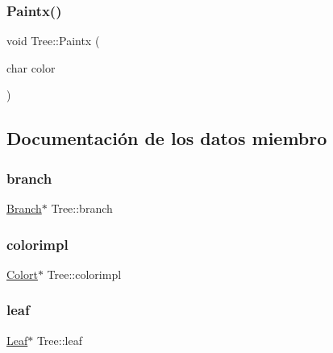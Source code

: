 \subsubsection{\texorpdfstring{Paintx()}{Paintx()}}
{\footnotesize\ttfamily void Tree\+::\+Paintx (\begin{DoxyParamCaption}\item[{char}]{color }\end{DoxyParamCaption})\hspace{0.3cm}{\ttfamily [inline]}}



\subsection{Documentación de los datos miembro}
\mbox{\label{class_tree_a56e2e117486ac449000deab0efac4a1e}} 
\subsubsection{\texorpdfstring{branch}{branch}}
{\footnotesize\ttfamily \mbox{\hyperlink{class_branch}{Branch}}$\ast$ Tree\+::branch}

\mbox{\label{class_tree_a2cd388a817a7325972d81589a6adc62b}} 
\subsubsection{\texorpdfstring{colorimpl}{colorimpl}}
{\footnotesize\ttfamily \mbox{\hyperlink{class_colort}{Colort}}$\ast$ Tree\+::colorimpl\hspace{0.3cm}{\ttfamily [protected]}}

\mbox{\label{class_tree_a4b20e3eadca4c054d79eb7a57579806f}} 
\subsubsection{\texorpdfstring{leaf}{leaf}}
{\footnotesize\ttfamily \mbox{\hyperlink{class_leaf}{Leaf}}$\ast$ Tree\+::leaf}

\mbox{\label{class_tree_a76114813e02925c4decabe9f837a02a9}} 
